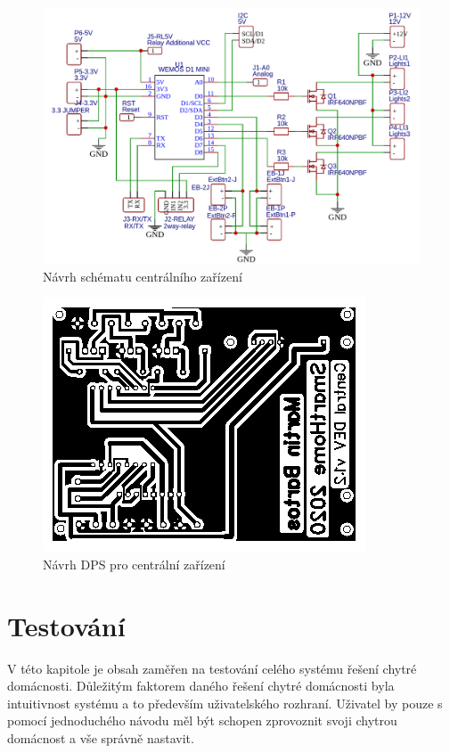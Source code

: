 \begin{figure}[hbt]
  \centering
  \includegraphics[width=1 \linewidth]{obrazky-figures/schematic.png}
  \caption{Návrh schématu centrálního zařízení}
  \label{figure:schema}
\end{figure}

\begin{figure}[hbt]
  \centering
  \includegraphics[width=0.6 \linewidth]{obrazky-figures/pcb.png}
  \caption{Návrh DPS pro centrální zařízení}
  \label{figure:schema}
\end{figure}

\chapter{Testování}
\label{testovani}
V této kapitole je obsah zaměřen na testování celého systému řešení chytré domácnosti.
Důležitým faktorem daného řešení chytré domácnosti byla intuitivnost systému a to především uživatelského rozhraní.
Uživatel by pouze s pomocí jednoduchého návodu měl být schopen zprovoznit svoji chytrou domácnost a vše správně nastavit.

